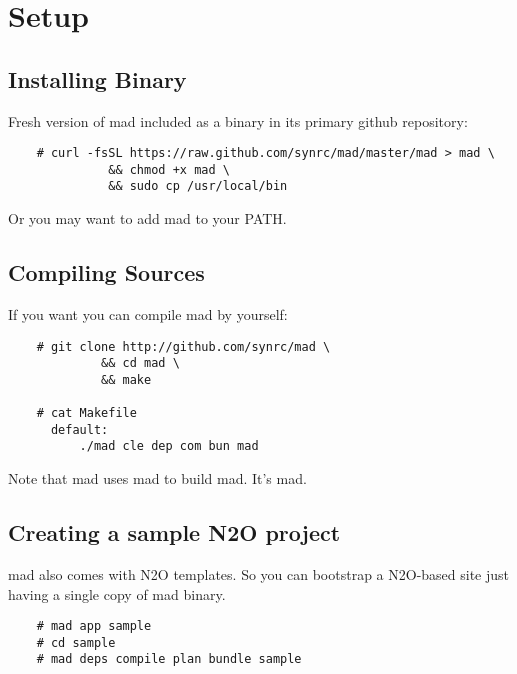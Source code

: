 \section{Setup}

\subsection{Installing Binary}

Fresh version of mad included as a binary in its primary github repository:

\vspace{1\baselineskip}
\begin{lstlisting}
    # curl -fsSL https://raw.github.com/synrc/mad/master/mad > mad \
              && chmod +x mad \
              && sudo cp /usr/local/bin
\end{lstlisting}
\vspace{1\baselineskip}

Or you may want to add mad to your PATH.

\subsection{Compiling Sources}

If you want you can compile mad by yourself:

\vspace{1\baselineskip}
\begin{lstlisting}
    # git clone http://github.com/synrc/mad \
             && cd mad \
             && make

    # cat Makefile
      default:
          ./mad cle dep com bun mad
\end{lstlisting}
\vspace{1\baselineskip}

Note that mad uses mad to build mad. It's mad.

\subsection{Creating a sample N2O project}

mad also comes with N2O templates. So you can bootstrap a N2O-based site
just having a single copy of mad binary.

\vspace{1\baselineskip}
\begin{lstlisting}
    # mad app sample
    # cd sample
    # mad deps compile plan bundle sample
\end{lstlisting}
\vspace{1\baselineskip}

